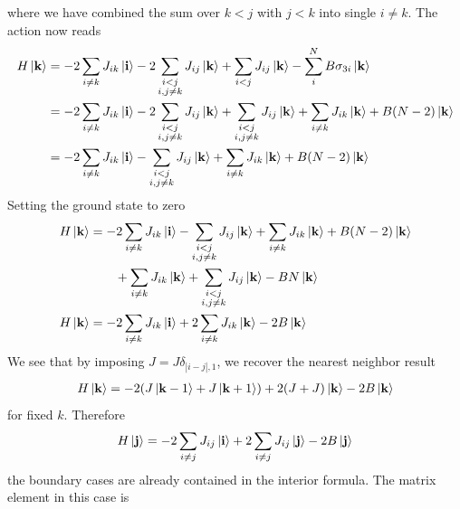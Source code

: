 \documentclass[../../../main.tex]{subfiles}
\begin{document}
where we have combined the sum over $k<j$ with $j<k$ into single $i \neq k$.
The action now reads
\begin{align*}
    H \ket{\mathbf{k}}
     & =-2\sum_{i \neq k}J_{ik}  \ket{\mathbf{i}} - 2\sum_{\substack{i<j \\i,j \neq k}}J_{ij}\ket{\mathbf{k}}   + \sum_{i<j} J_{ij}\ket{\mathbf{k}} - \sum_{i } ^N B \sigma_{3i}\ket{\mathbf{k}} \\
     & =-2\sum_{i \neq k}J_{ik}  \ket{\mathbf{i}} - 2\sum_{\substack{i<j \\i,j \neq k}}J_{ij}\ket{\mathbf{k}}   + \sum_{\substack{i<j\\i,j \neq k}}J_{ij} \ket{\mathbf{k}}+ \sum_{i \neq k}  J_{ik}\ket{\mathbf{k}} + B(N-2)\ket{\mathbf{k}} \\
     & =-2\sum_{i \neq k}J_{ik}  \ket{\mathbf{i}} - \sum_{\substack{i<j  \\i,j \neq k}}J_{ij}\ket{\mathbf{k}} + \sum_{i \neq k}  J_{ik}\ket{\mathbf{k}} + B(N-2)\ket{\mathbf{k}}
\end{align*}
Setting the ground state to zero
\begin{align*}
    H \ket{\mathbf{k}}
     & =-2\sum_{i \neq k}J_{ik}  \ket{\mathbf{i}} - \sum_{\substack{i<j                                          \\i,j \neq k}}J_{ij}\ket{\mathbf{k}} + \sum_{i \neq k}  J_{ik}\ket{\mathbf{k}} + B(N-2)\ket{\mathbf{k}} \\
     & \qquad +\sum_{i \neq k}J_{ik}\ket{\mathbf{k}} +\sum_{\substack{i<j                                        \\i,j \neq k}}J_{ij}\ket{\mathbf{k}} -BN   \ket{\mathbf{k}}\\
    H \ket{\mathbf{k}}
     & =-2\sum_{i \neq k}J_{ik}  \ket{\mathbf{i}} +2 \sum_{i \neq k}  J_{ik}\ket{\mathbf{k}} -2B\ket{\mathbf{k}}
\end{align*}
We see that by imposing $J= J\delta_{|i-j|,1}$,  we recover the nearest neighbor result
\begin{align*}
    H \ket{\mathbf{k}}
    = -2(J \ket{\mathbf{k}-1}+J\ket{\mathbf{k}+1}) + 2 (J+J) \ket{\mathbf{k}}- 2B \ket{\mathbf{k}}
\end{align*}
for fixed $k$.
Therefore
\begin{equation*}
    H \ket{\mathbf{j} } =
    -2\sum_{i \neq j}J_{ij}  \ket{\mathbf{i}} +2 \sum_{i \neq j}  J_{ij}\ket{\mathbf{j}} -2B\ket{\mathbf{j}}
\end{equation*}
the boundary cases are already contained in the interior formula.
The matrix element in this case is
\end{document}
